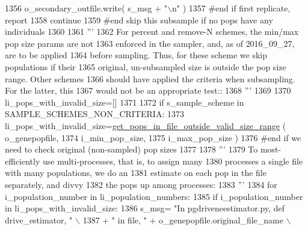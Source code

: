 \begin{DoxyCode}
1356                 o\_secondary\_outfile.write( s\_msg + \textcolor{stringliteral}{"\(\backslash\)n"} )
1357             \textcolor{comment}{#end if first replicate, report}
1358             \textcolor{keywordflow}{continue}
1359         \textcolor{comment}{#end skip this subsample if no pops have any individuals}
1360 
1361         \textcolor{stringliteral}{'''}
1362 \textcolor{stringliteral}{        For percent and remove-N schemes, the min/max pop size params are not }
1363 \textcolor{stringliteral}{        enforced in the sampler, and, as of 2016\_09\_27, are to be applied}
1364 \textcolor{stringliteral}{        before sampling.  Thus, for these scheme we skip populations if their }
1365 \textcolor{stringliteral}{        original, un-subsampled size is outside the pop size range.  Other schemes}
1366 \textcolor{stringliteral}{        should have applied the criteria when subsampling.  For the latter, this}
1367 \textcolor{stringliteral}{        would not be an appropriate test::}
1368 \textcolor{stringliteral}{        '''}
1369 
1370         li\_pops\_with\_invalid\_size=[]
1371         
1372         \textcolor{keywordflow}{if} s\_sample\_scheme \textcolor{keywordflow}{in} SAMPLE\_SCHEMES\_NON\_CRITERIA:
1373             li\_pops\_with\_invalid\_size=\hyperlink{namespacenegui_1_1pgdriveneestimator_ab546af99f06d3ec795da61f806ffafa9}{get\_pops\_in\_file\_outside\_valid\_size\_range}
      ( o\_genepopfile, 
1374                                                                                 i\_min\_pop\_size,
1375                                                                                 i\_max\_pop\_size )
1376         \textcolor{comment}{#end if we need to check original (non-sampled) pop sizes}
1377 
1378         \textcolor{stringliteral}{'''}
1379 \textcolor{stringliteral}{        To most-efficiently use multi-processes, that is, to assign many}
1380 \textcolor{stringliteral}{        processes a single file with many populations, we do an}
1381 \textcolor{stringliteral}{        estimate on each pop in the file separately, and divvy}
1382 \textcolor{stringliteral}{        the pops up among processes:}
1383 \textcolor{stringliteral}{        '''}
1384         \textcolor{keywordflow}{for} i\_population\_number \textcolor{keywordflow}{in} li\_population\_numbers:
1385             \textcolor{keywordflow}{if} i\_population\_number \textcolor{keywordflow}{in} li\_pops\_with\_invalid\_size:
1386                 s\_msg= \textcolor{stringliteral}{"In pgdriveneestimator.py, def drive\_estimator, "} \(\backslash\)
1387                                 + \textcolor{stringliteral}{" in file, "} + o\_genepopfile.original\_file\_name \(\backslash\)

\end{DoxyCode}
